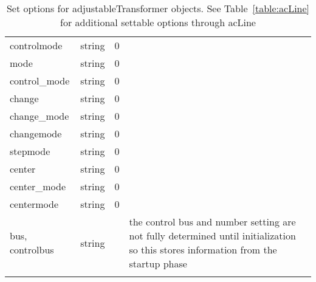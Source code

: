 \begin{longtable}{p{5cm} c c p{7cm}}
controlmode & string & 0 & \\
mode & string & 0 & \\
control\_mode & string & 0 & \\
change & string & 0 & \\
change\_mode & string & 0 & \\
changemode & string & 0 & \\
stepmode & string & 0 & \\
center & string & 0 & \\
center\_mode & string & 0 & \\
centermode & string & 0 & \\
bus, controlbus & string &  & the control bus and number setting are not fully determined until initialization so this stores information from the startup phase\\
\hline
\caption{Set options for adjustableTransformer objects. See Table~\ref{table:acLine} for additional settable options through acLine}
\label{table:adjustableTransformer}
\end{longtable}

